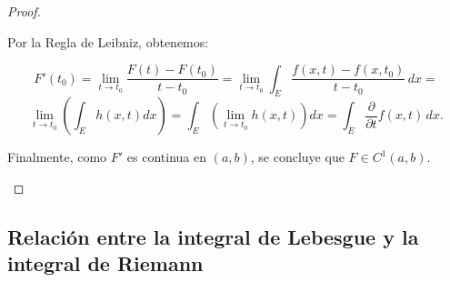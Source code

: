 \begin{proof}
\begin{enumerate}
              Por la Regla de Leibniz, obtenemos:

              \[
                  F'(t_0) = \lim_{t \to t_0} \frac{F(t) - F(t_0)}{t - t_0} = \lim_{t \to t_0} \int_E \frac{f(x,t) - f(x,t_0)}{t - t_0} \,dx =
              \]
              \[
                  \lim_{t \to t_0} \left( \int_E h(x,t) dx \right) = \int_E \left( \lim_{t \to t_0} h(x,t) \right) dx = \int_E \frac{\partial}{\partial t} f(x,t) \,dx.
              \]

              Finalmente, como \( F' \) es continua en \( (a,b) \), se concluye que \( F \in
              C^1(a,b) \).

    \end{enumerate}
\end{proof}

\subsection{Relación entre la integral de Lebesgue y la integral de Riemann}

